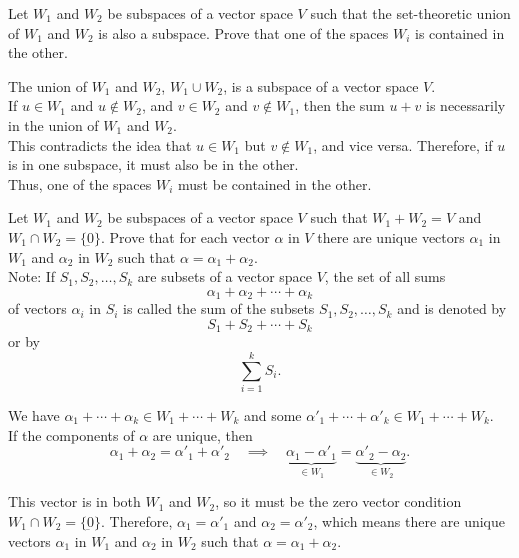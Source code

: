 \documentclass[11pt]{article}
\begin{document}
\begin{homeworkProblem}
    Let $W_1$ and $W_2$ be subspaces of a vector space $V$ such that the set-theoretic union of $W_1$ and
    $W_2$ is also a subspace. Prove that one of the spaces $W_i$ is contained in the other. \\

    \solution

    The union of $W_1$ and $W_2$, $W_1 \cup W_2$, is a subspace of a vector space $V$. \\

    If $u \in W_1$ and $u \notin W_2$, and $v \in W_2$ and $v \notin W_1$,
    then the sum $u + v$ is necessarily in the union of $W_1$ and $W_2$. \\

    This contradicts the idea that $u \in W_1$ but $v \notin W_1$, and vice versa.
    Therefore, if $u$ is in one subspace, it must also be in the other. \\

    Thus, one of the spaces $W_i$ must be contained in the other.

\end{homeworkProblem}

\pagebreak

\begin{homeworkProblem}
    Let $W_1$ and $W_2$ be subspaces of a vector space $V$ such that $W_1 + W_2 = V$ and $W_1 \cap W_2 = \{\underbar{0}\}$.
    Prove that for each vector $\alpha$ in $V$ there are unique vectors $\alpha_1$ in $W_1$ and $\alpha_2$ in $W_2$ such that
    $\alpha = \alpha_1 + \alpha_2$. \\

    Note: If $S_1, S_2, \ldots, S_k$ are subsets of a vector space $V$, the set of all sums
    \[
        \alpha_1 + \alpha_2 + \cdots + \alpha_k
    \]
    of vectors $\alpha_i$ in $S_i$ is called the sum of the subsets $S_1, S_2, \ldots, S_k$ and is denoted by
    \[
        S_1 + S_2 + \cdots + S_k
    \]
    or by
    \[
        \sum_{i=1}^k S_i.
    \] \vspace*{1\baselineskip}

    \solution

    We have $\alpha_1 + \cdots + \alpha_k \in W_1 + \cdots + W_k$ and some $\alpha'_1 + \cdots + \alpha'_k \in W_1 + \cdots + W_k$. \\

    If the components of $\alpha$ are unique, then
    \[
        \alpha_1 + \alpha_2 = \alpha'_1 + \alpha'_2 \quad \implies \quad \underbrace{\alpha_1 - \alpha'_1}_{\in W_1} = \underbrace{\alpha'_2 - \alpha_2}_{\in W_2}.
    \]

    This vector is in both $W_1$ and $W_2$, so it must be the zero vector condition $W_1 \cap W_2 = \{\underbar{0}\}$.
    Therefore, $\alpha_1 = \alpha'_1$ and $\alpha_2 = \alpha'_2$, which means there are unique vectors $\alpha_1$ in $W_1$ and $\alpha_2$ in $W_2$ such that
    $\alpha = \alpha_1 + \alpha_2$.
\end{homeworkProblem}
\end{document}
